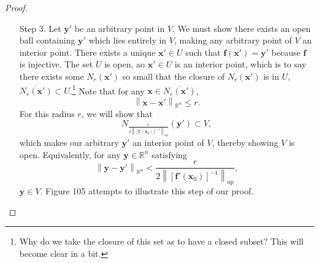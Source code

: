 \documentclass{article}
\newcommand{\R}{\mathbb{R}}
\newcommand{\x}{\mathbf{x}}
\newcommand{\f}{\mathbf{f}}
\newcommand{\y}{\mathbf{y}}
\newcommand{\norm}[1]{\left\lVert#1\right\rVert}
\newcommand{\normop}[1]{\left\lVert#1\right\rVert_\text{op}}
\theoremstyle{definition}
\begin{document}
\begin{proof}
\begin{enumerate}
			\item [Step 3.] Let $ \y'$ be an arbitrary point in $ V $. We must show there exists an open ball containing $ \y' $ which lies entirely in  $ V $, making any arbitrary point of $ V $ an interior point.  There exists a unique $ \x'\in U $ such that $ \f(\x')=\y' $ because $ \f $ is injective. The set $ U $ is open, ao $ \x'\in U $ is an interior point, which is to say there exists some $ N_r(\x') $ so small that the closure of $ N_r(\x') $ is in $ U $, $ \overline{N_r(\x')}\subset U $.\footnote{Why do we take the closure of this set as to have a closed subset? This will become clear in a bit.} Note that for any $ \x \in \overline{N_r(\x')} $, 
			\begin{equation}\label{key}
				\norm{\x-\x'}_{\R^n} \le r.
			\end{equation}
			For this radius $ r $, we will show that $$ N_{\frac{r}{2\normop{[\f'(\x_0)]^{-1}}}}(\y')\subset V ,$$ which makes our arbitrary $ \y' $ an interior point of $ V $, thereby showing $ V $ is open. Equivalently, for any $ \y\in \R^n $ satisfying
			\begin{equation}\label{key}
				\norm{\y-\y'}_{\R^n} < \frac{r}{2\normop{[\f'(\x_0)]^{-1}}},
			\end{equation}
			$ \y\in V $. Figure 105 attempts to illustrate this step of our proof.
			
			
			\begin{figure}[h!]
				\centering
\end{figure}
\end{enumerate}
\end{proof}
\end{document}
